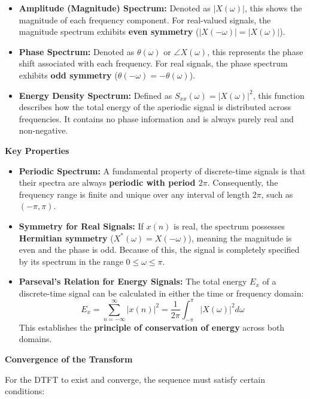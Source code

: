 \begin{itemize}
\tightlist
\item
  \textbf{Amplitude (Magnitude) Spectrum:} Denoted as
  \textbf{\(|X(\omega)|\)}, this shows the magnitude of each frequency
  component. For real-valued signals, the magnitude spectrum exhibits
  \textbf{even symmetry} (\(|X(-\omega)| = |X(\omega)|\)).
\item
  \textbf{Phase Spectrum:} Denoted as \textbf{\(\theta(\omega)\)} or
  \textbf{\(\angle X(\omega)\)}, this represents the phase shift
  associated with each frequency. For real signals, the phase spectrum
  exhibits \textbf{odd symmetry}
  (\(\theta(-\omega) = -\theta(\omega)\)).
\item
  \textbf{Energy Density Spectrum:} Defined as
  \textbf{\(S_{xx}(\omega) = |X(\omega)|^2\)}, this function describes
  how the total energy of the aperiodic signal is distributed across
  frequencies. It contains no phase information and is always purely
  real and non-negative.
\end{itemize}

\textbf{Key Properties}

\begin{itemize}
\tightlist
\item
  \textbf{Periodic Spectrum:} A fundamental property of discrete-time
  signals is that their spectra are always \textbf{periodic with period
  \(2\pi\)}. Consequently, the frequency range is finite and unique over
  any interval of length \(2\pi\), such as \((-\pi, \pi)\).
\item
  \textbf{Symmetry for Real Signals:} If \(x(n)\) is real, the spectrum
  possesses \textbf{Hermitian symmetry} (\(X^*(\omega) = X(-\omega)\)),
  meaning the magnitude is even and the phase is odd. Because of this,
  the signal is completely specified by its spectrum in the range
  \(0 \leq \omega \leq \pi\).
\item
  \textbf{Parseval's Relation for Energy Signals:} The total energy
  \(E_x\) of a discrete-time signal can be calculated in either the time
  or frequency domain:
  \[E_x = \sum_{n=-\infty}^{\infty} |x(n)|^2 = \frac{1}{2\pi} \int_{-\pi}^{\pi} |X(\omega)|^2 d\omega\]
  This establishes the \textbf{principle of conservation of energy}
  across both domains.
\end{itemize}

\textbf{Convergence of the Transform}

For the DTFT to exist and converge, the sequence must satisfy certain
conditions:

